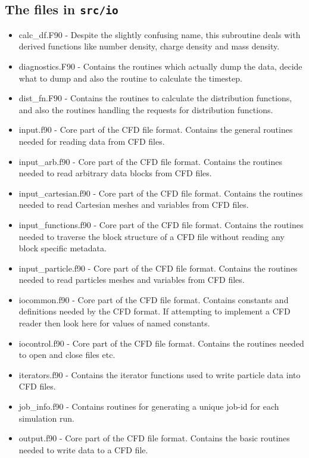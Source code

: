 \documentclass[12pt,a4paper]{article}
\newcommand{\inlinecode}[1]{{\color{warwickred} \bf\texttt{#1}}}
\begin{document}
\subsection{The files in \inlinecode{src/io}}
\begin{itemize}
\item calc\_df.F90 - Despite the slightly confusing name, this subroutine
  deals with derived functions like number density, charge density and mass
  density.
\item diagnostics.F90 - Contains the routines which actually dump the data,
  decide what to dump and also the routine to calculate the timestep.
\item dist\_fn.F90 - Contains the routines to calculate the distribution
  functions, and also the routines handling the requests for distribution
  functions.
\item input.f90 - Core part of the CFD file format. Contains the general
  routines needed for reading data from CFD files.
\item input\_arb.f90 - Core part of the CFD file format. Contains the routines
  needed to read arbitrary data blocks from CFD files.
\item input\_cartesian.f90 - Core part of the CFD file format. Contains the
  routines needed to read Cartesian meshes and variables from CFD files.
\item input\_functions.f90 - Core part of the CFD file format. Contains the
  routines needed to traverse the block structure of a CFD file without
  reading any block specific metadata.
\item input\_particle.f90 - Core part of the CFD file format. Contains the
  routines needed to read particles meshes and variables from CFD files.
\item iocommon.f90 - Core part of the CFD file format. Contains constants and
  definitions needed by the CFD format. If attempting to implement a CFD
  reader then look here for values of named constants.
\item iocontrol.f90 - Core part of the CFD file format. Contains the routines
  needed to open and close files etc.
\item iterators.f90 - Contains the iterator functions used to write particle
  data into CFD files.
\item job\_info.f90 - Contains routines for generating a unique job-id for
  each simulation run.
\item output.f90 - Core part of the CFD file format. Contains the basic
  routines needed to write data to a CFD file.

\end{itemize}
\end{document}
